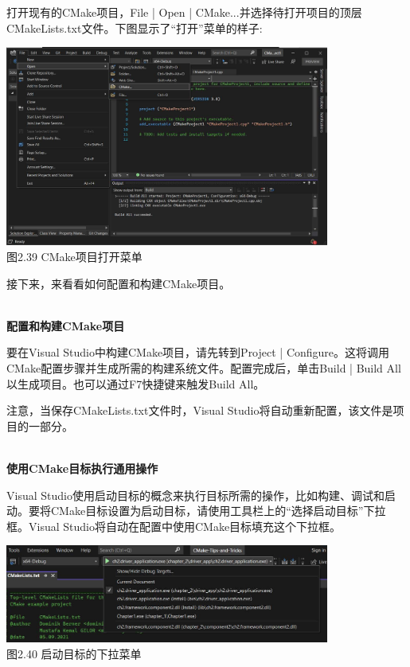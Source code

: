 打开现有的CMake项目，File | Open | CMake...并选择待打开项目的顶层CMakeLists.txt文件。下图显示了“打开”菜单的样子:

\begin{center}
\includegraphics[width=0.8\textwidth]{content/1/chapter2/images/39.jpg}\\
图2.39 CMake项目打开菜单
\end{center}

接下来，来看看如何配置和构建CMake项目。

\hspace*{\fill} \\ %
\noindent
\textbf{配置和构建CMake项目}

要在Visual Studio中构建CMake项目，请先转到Project | Configure。这将调用CMake配置步骤并生成所需的构建系统文件。配置完成后，单击Build | Build All以生成项目。也可以通过F7快捷键来触发Build All。

注意，当保存CMakeLists.txt文件时，Visual Studio将自动重新配置，该文件是项目的一部分。

\hspace*{\fill} \\ %
\noindent
\textbf{使用CMake目标执行通用操作}

Visual Studio使用启动目标的概念来执行目标所需的操作，比如构建、调试和启动。要将CMake目标设置为启动目标，请使用工具栏上的“选择启动目标”下拉框。Visual Studio将自动在配置中使用CMake目标填充这个下拉框。

\begin{center}
\includegraphics[width=0.8\textwidth]{content/1/chapter2/images/40.jpg}\\
图2.40 启动目标的下拉菜单
\end{center}

